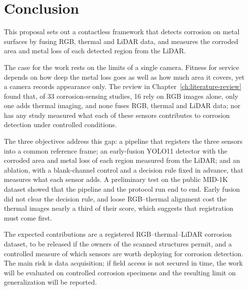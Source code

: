 \chapter[CONCLUSION]{Conclusion}
\label{ch:conclusion}

This proposal sets out a contactless framework that detects corrosion on metal
surfaces by fusing RGB, thermal and LiDAR data, and measures the corroded area
and metal loss of each detected region from the LiDAR.

The case for the work rests on the limits of a single camera. Fitness for
service depends on how deep the metal loss goes as well as how much area it
covers, yet a camera records appearance only. The review in
Chapter~\ref{ch:literature-review} found that, of 33 corrosion-sensing studies,
16 rely on RGB images alone, only one adds thermal imaging, and none fuses RGB,
thermal and LiDAR data; nor has any study measured what each of these sensors
contributes to corrosion detection under controlled conditions.

The three objectives address this gap: a pipeline that registers the three
sensors into a common reference frame; an early-fusion YOLO11 detector with the
corroded area and metal loss of each region measured from the LiDAR; and an
ablation, with a blank-channel control and a decision rule fixed in advance,
that measures what each sensor adds. A preliminary test on the public MID-1K
dataset showed that the pipeline and the protocol run end to end. Early fusion
did not clear the decision rule, and loose RGB--thermal alignment cost the
thermal images nearly a third of their score, which suggests that registration
must come first.

The expected contributions are a registered RGB--thermal--LiDAR corrosion
dataset, to be released if the owners of the scanned structures permit, and a
controlled measure of which sensors are worth deploying for corrosion detection.
The main risk is data acquisition; if field access is not secured in time, the
work will be evaluated on controlled corrosion specimens and the resulting limit
on generalization will be reported.
